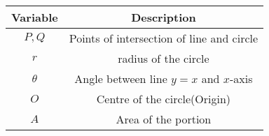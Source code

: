 \begin{tabular}[12pt]{ |c| c|}
    \hline
    \textbf{Variable} & \textbf{Description}\\ 
    \hline
    $P,Q$ & Points of intersection of line and circle \\
    \hline 
    $r$ & radius of the circle\\
    \hline
    $\theta$ & Angle between line $y=x$ and $x$-axis\\
    \hline
    $O$ & Centre of the circle(Origin)\\
    \hline 
    $A$ & Area of the portion \\
    \hline
    \end{tabular}
